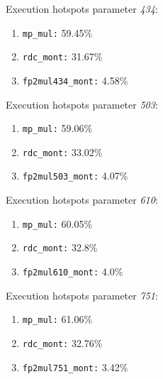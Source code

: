 Execution hotspots parameter \textit{434}:
\begin{enumerate}[noitemsep]
	\item \texttt{mp\_mul:} 59.45\%
	\item \texttt{rdc\_mont:} 31.67\%
	\item \texttt{fp2mul434\_mont:} 4.58\%
\end{enumerate}
Execution hotspots parameter \textit{503}:
\begin{enumerate}[noitemsep]
	\item \texttt{mp\_mul:} 59.06\%
	\item \texttt{rdc\_mont:} 33.02\%
	\item \texttt{fp2mul503\_mont:} 4.07\%
\end{enumerate}
Execution hotspots parameter \textit{610}:
\begin{enumerate}[noitemsep]
	\item \texttt{mp\_mul:} 60.05\%
	\item \texttt{rdc\_mont:} 32.8\%
	\item \texttt{fp2mul610\_mont:} 4.0\%
\end{enumerate}
Execution hotspots parameter \textit{751}:
\begin{enumerate}[noitemsep]
	\item \texttt{mp\_mul:} 61.06\%
	\item \texttt{rdc\_mont:} 32.76\%
	\item \texttt{fp2mul751\_mont:} 3.42\%
\end{enumerate}
